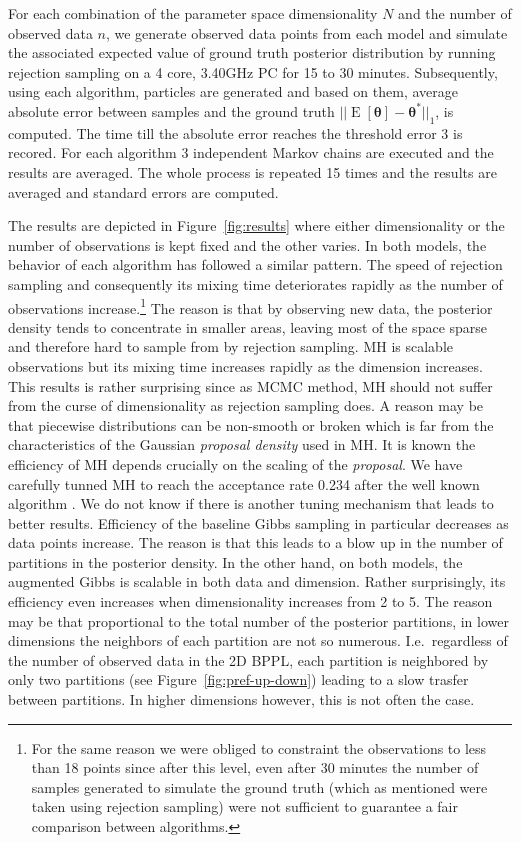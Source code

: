 For each combination of the parameter space dimensionality $N$ and the number of observed data $n$, we generate observed data points from each model and simulate the associated expected value of ground truth posterior distribution by running rejection sampling on a 4 core, 3.40GHz PC for 15 to 30 minutes.
Subsequently, using each algorithm, particles are generated and based on them, 
average absolute error between samples and the ground truth $||\operatorname{E}[\boldsymbol\theta] - \boldsymbol\theta^*||_1$, is computed. 
The time till the absolute error reaches the threshold error 3 is recored.
For each algorithm 3 independent Markov chains are executed and the results are averaged.
The whole process is repeated 15 times and the results are averaged and standard errors are computed. 

The results are depicted in Figure~\ref{fig:results} where either dimensionality or the number of observations is kept fixed and the other varies. 
In both models, the behavior of each algorithm has followed a similar pattern. 
The speed of rejection sampling and consequently its mixing time deteriorates rapidly as the number of observations increase.\footnote{For the same reason we were obliged to constraint the observations to less than 18 points since after this level, even after 30 minutes the number of samples generated to simulate the ground truth (which as mentioned were taken using rejection sampling) were not sufficient to guarantee a fair comparison between algorithms.}
The reason is that by observing new data, the posterior density tends to concentrate in smaller areas, 
leaving most of the space sparse and therefore hard to sample from by rejection sampling.
MH is scalable observations but its mixing time increases rapidly as the dimension increases. 
This results is rather surprising since as MCMC method, MH should not suffer from the curse of dimensionality as rejection sampling does. 
A reason may be that piecewise distributions can be non-smooth or broken which is far from the characteristics of the Gaussian \emph{proposal density} used in MH. 
It is known the efficiency of MH depends crucially on the scaling of the \emph{proposal}.
We have carefully tunned MH to reach the acceptance rate 0.234 after the well known algorithm \cite{Roberts:97}. We do not know if there is another tuning mechanism that leads to better results.
Efficiency of the baseline Gibbs sampling in particular decreases as data points increase.
The reason is that this leads to a blow up in the number of partitions in the posterior density.
In the other hand, on both models, the augmented Gibbs is scalable in both data and dimension. 
Rather surprisingly, its efficiency even increases when dimensionality increases from 2 to 5.
The reason may be that proportional to the total number of the posterior partitions, in lower dimensions the neighbors of each partition are not so numerous. 
I.e.\ regardless of the number of observed data in the 2D BPPL, each partition is neighbored by only two partitions (see Figure~\ref{fig:pref-up-down}) leading to a slow trasfer between partitions. 
In higher dimensions however, this is not often the case.

